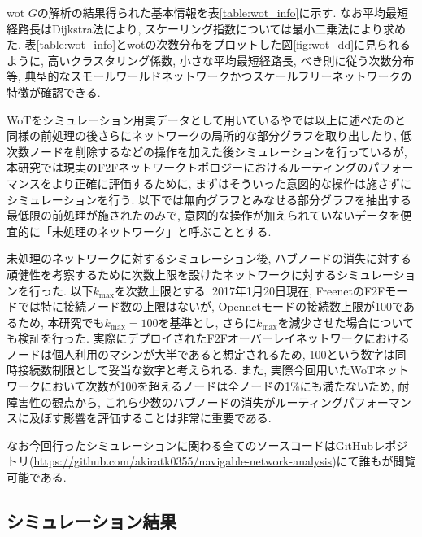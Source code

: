 \documentclass[dvipdfmx]{ampbt}
\begin{document}
  \acrshort{wot} $G$の解析の結果得られた基本情報を表\ref{table:wot_info}に示す. なお平均最短経路長はDijkstra法により, スケーリング指数については最小二乗法により求めた. 表\ref{table:wot_info}と\acrshort{wot}の次数分布をプロットした図\ref{fig:wot_dd}に見られるように, 高いクラスタリング係数, 小さな平均最短経路長, べき則に従う次数分布等, 典型的なスモールワールドネットワークかつスケールフリーネットワークの特徴が確認できる. 

 WoTをシミュレーション用実データとして用いている\cite{sandberg2006distributed}や\cite{clarke2010private}では以上に述べたのと同様の前処理の後さらにネットワークの局所的な部分グラフを取り出したり, 低次数ノードを削除するなどの操作を加えた後シミュレーションを行っているが, 本研究では現実のF2Fネットワークトポロジーにおけるルーティングのパフォーマンスをより正確に評価するために, まずはそういった意図的な操作は施さずにシミュレーションを行う. 以下では無向グラフとみなせる部分グラフを抽出する最低限の前処理が施されたのみで, 意図的な操作が加えられていないデータを便宜的に「未処理のネットワーク」と呼ぶこととする.

未処理のネットワークに対するシミュレーション後, ハブノードの消失に対する頑健性を考察するために次数上限を設けたネットワークに対するシミュレーションを行った. 以下$k_{\max}$を次数上限とする. 2017年1月20日現在, FreenetのF2Fモードでは特に接続ノード数の上限はないが, Opennetモードの接続数上限が100であるため, 本研究でも$k_{\max}=100$を基準とし, さらに$k_{\max}$を減少させた場合についても検証を行った. 実際にデプロイされたF2Fオーバーレイネットワークにおけるノードは個人利用のマシンが大半であると想定されるため, 100という数字は同時接続数制限として妥当な数字と考えられる. また, 実際今回用いたWoTネットワークにおいて次数が100を超えるノードは全ノードの1\%にも満たないため, 耐障害性の観点から, これら少数のハブノードの消失がルーティングパフォーマンスに及ぼす影響を評価することは非常に重要である.

なお今回行ったシミュレーションに関わる全てのソースコードはGitHubレポジトリ(\url{https://github.com/akiratk0355/navigable-network-analysis})にて誰もが閲覧可能である.


  \subsection{シミュレーション結果}
\end{document}
